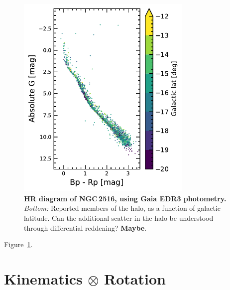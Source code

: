 \documentclass[12pt,twocolumn,tighten]{aastex63}
\begin{document}
\begin{figure}[t]
	\begin{center}
		\leavevmode
			\includegraphics[width=0.75\textwidth]{f2c.pdf}
	\end{center}
	\vspace{-0.7cm}
  \caption{ {\bf HR diagram of NGC\,2516, using Gaia EDR3 photometry.}
    {\it Bottom:} Reported members of the halo, as a function of
    galactic latitude. Can the additional scatter in the halo be
    understood through differential reddening?
    {\bf Maybe}.
    \label{fig:diffred}
  }
\end{figure}

Figure~\ref{fig:diffred}.


\section{Kinematics $\otimes$ Rotation}
\label{app:gaia6d_x_rotn}
\end{document}
